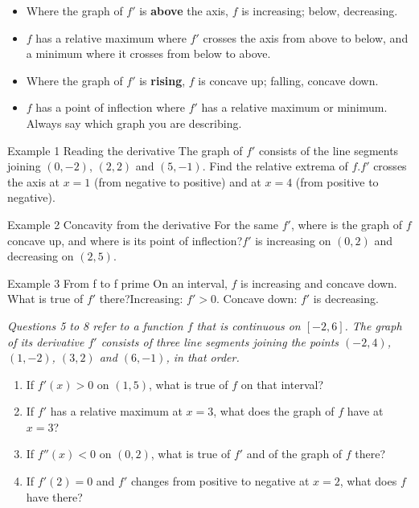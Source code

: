 \documentclass[11pt]{article}
\begin{document}

\begin{ideabox}
\begin{itemize}[leftmargin=*,itemsep=2pt,topsep=2pt]
  \item Where the graph of $f'$ is \textbf{above} the axis, $f$ is increasing; below, decreasing.
  \item $f$ has a relative maximum where $f'$ crosses the axis from above to below, and a minimum where it crosses from below to above.
  \item Where the graph of $f'$ is \textbf{rising}, $f$ is concave up; falling, concave down.
  \item $f$ has a point of inflection where $f'$ has a relative maximum or minimum. Always say which graph you are describing.
\end{itemize}
\end{ideabox}

\begin{example}{Example 1 \textperiodcentered{} Reading the derivative}
The graph of $f'$ consists of the line segments joining $(0,-2)$, $(2,2)$ and $(5,-1)$. Find the relative extrema of $f$.\soln $f'$ crosses the axis at $x=1$ (from negative to positive) and at $x=4$ (from positive to negative).
\end{example}

\begin{example}{Example 2 \textperiodcentered{} Concavity from the derivative}
For the same $f'$, where is the graph of $f$ concave up, and where is its point of inflection?\soln $f'$ is increasing on $(0,2)$ and decreasing on $(2,5)$.
\end{example}

\begin{example}{Example 3 \textperiodcentered{} From f to f prime}
On an interval, $f$ is increasing and concave down. What is true of $f'$ there?\soln Increasing: $f'>0$. Concave down: $f'$ is decreasing.
\end{example}

\newpage
{}
\emph{Questions 5 to 8 refer to a function $f$ that is continuous on $[-2,6]$. The graph of its derivative $f'$ consists of three line segments joining the points $(-2,4)$, $(1,-2)$, $(3,2)$ and $(6,-1)$, in that order.}
\begin{enumerate}[leftmargin=*,itemsep=2pt]
  \item If $f'(x)>0$ on $(1,5)$, what is true of $f$ on that interval?\work{2.3cm}
  \item If $f'$ has a relative maximum at $x=3$, what does the graph of $f$ have at $x=3$?\work{2.3cm}
  \item If $f''(x)<0$ on $(0,2)$, what is true of $f'$ and of the graph of $f$ there?\work{2.3cm}
  \item If $f'(2)=0$ and $f'$ changes from positive to negative at $x=2$, what does $f$ have there?\work{2.3cm}
\end{enumerate}
\end{document}
